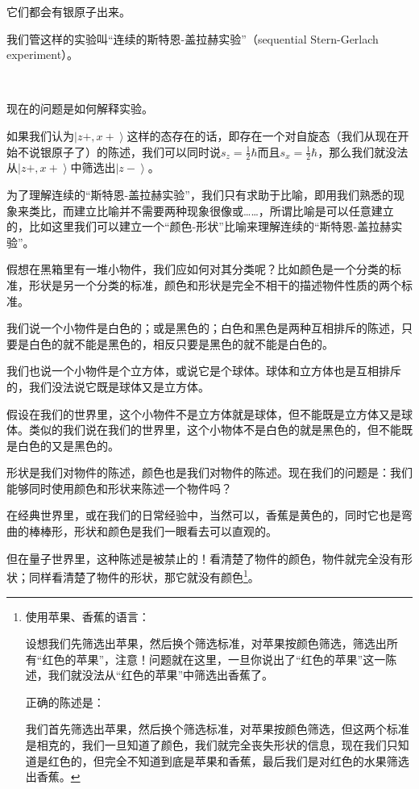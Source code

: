 它们都会有银原子出来。

我们管这样的实验叫“连续的斯特恩-盖拉赫实验”（sequential Stern-Gerlach experiment）。

~

现在的问题是如何解释实验。

如果我们认为$\left| z+, x+ \right\rangle$这样的态存在的话，即存在一个对自旋态（我们从现在开始不说银原子了）的陈述，我们可以同时说$s_z = \frac{1}{2}\hbar$而且$s_x = \frac{1}{2}\hbar$，那么我们就没法从$\left| z+, x+ \right\rangle$中筛选出$\left| z- \right\rangle$。


为了理解连续的“斯特恩-盖拉赫实验”，我们只有求助于比喻，即用我们熟悉的现象来类比，而建立比喻并不需要两种现象很像或……，所谓比喻是可以任意建立的，比如这里我们可以建立一个“颜色-形状”比喻来理解连续的“斯特恩-盖拉赫实验”。

假想在黑箱里有一堆小物件，我们应如何对其分类呢？比如颜色是一个分类的标准，形状是另一个分类的标准，颜色和形状是完全不相干的描述物件性质的两个标准。

我们说一个小物件是白色的；或是黑色的；白色和黑色是两种互相排斥的陈述，只要是白色的就不能是黑色的，相反只要是黑色的就不能是白色的。

我们也说一个小物件是个立方体，或说它是个球体。球体和立方体也是互相排斥的，我们没法说它既是球体又是立方体。

假设在我们的世界里，这个小物件不是立方体就是球体，但不能既是立方体又是球体。类似的我们说在我们的世界里，这个小物体不是白色的就是黑色的，但不能既是白色的又是黑色的。

形状是我们对物件的陈述，颜色也是我们对物件的陈述。现在我们的问题是：我们能够同时使用颜色和形状来陈述一个物件吗？

在经典世界里，或在我们的日常经验中，当然可以，香蕉是黄色的，同时它也是弯曲的棒棒形，形状和颜色是我们一眼看去可以直观的。

但在量子世界里，这种陈述是被禁止的！看清楚了物件的颜色，物件就完全没有形状；同样看清楚了物件的形状，那它就没有颜色\footnote{使用苹果、香蕉的语言：

设想我们先筛选出苹果，然后换个筛选标准，对苹果按颜色筛选，筛选出所有“红色的苹果”，注意！问题就在这里，一旦你说出了“红色的苹果”这一陈述，我们就没法从“红色的苹果”中筛选出香蕉了。

正确的陈述是：

我们首先筛选出苹果，然后换个筛选标准，对苹果按颜色筛选，但这两个标准是相克的，我们一旦知道了颜色，我们就完全丧失形状的信息，现在我们只知道是红色的，但完全不知道到底是苹果和香蕉，最后我们是对红色的水果筛选出香蕉。}。


